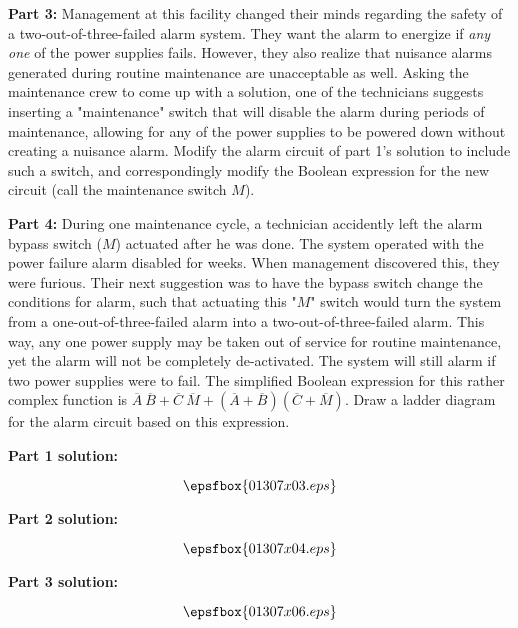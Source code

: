 \vskip 10pt

{\bf Part 3:} Management at this facility changed their minds regarding the safety of a two-out-of-three-failed alarm system.  They want the alarm to energize if {\it any one} of the power supplies fails.  However, they also realize that nuisance alarms generated during routine maintenance are unacceptable as well.  Asking the maintenance crew to come up with a solution, one of the technicians suggests inserting a "maintenance" switch that will disable the alarm during periods of maintenance, allowing for any of the power supplies to be powered down without creating a nuisance alarm.  Modify the alarm circuit of part 1's solution to include such a switch, and correspondingly modify the Boolean expression for the new circuit (call the maintenance switch $M$).

\vskip 10pt

{\bf Part 4:} During one maintenance cycle, a technician accidently left the alarm bypass switch ($M$) actuated after he was done.  The system operated with the power failure alarm disabled for weeks.  When management discovered this, they were furious.  Their next suggestion was to have the bypass switch change the conditions for alarm, such that actuating this "$M$" switch would turn the system from a one-out-of-three-failed alarm into a two-out-of-three-failed alarm.  This way, any one power supply may be taken out of service for routine maintenance, yet the alarm will not be completely de-activated.  The system will still alarm if two power supplies were to fail.  The simplified Boolean expression for this rather complex function is $\overline{A} \> \overline{B} + \overline{C} \> \overline{M} + (\overline{A} + \overline{B})(\overline{C} + \overline{M})$.  Draw a ladder diagram for the alarm circuit based on this expression.







{\bf Part 1 solution:}

$$\epsfbox{01307x03.eps}$$

\vskip 10pt

{\bf Part 2 solution:}

$$\epsfbox{01307x04.eps}$$

\vskip 10pt

{\bf Part 3 solution:}

$$\epsfbox{01307x06.eps}$$

